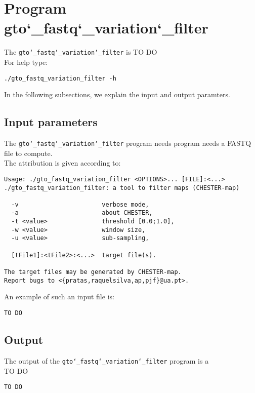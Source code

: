 \section{Program gto\char`_fastq\char`_variation\char`_filter}
The \texttt{gto\char`_fastq\char`_variation\char`_filter} is TO DO\\
For help type:
\begin{lstlisting}
./gto_fastq_variation_filter -h
\end{lstlisting}
In the following subsections, we explain the input and output paramters.

\subsection*{Input parameters}

The \texttt{gto\char`_fastq\char`_variation\char`_filter} program needs program needs a FASTQ file to compute.\\
The attribution is given according to:
\begin{lstlisting}
Usage: ./gto_fastq_variation_filter <OPTIONS>... [FILE]:<...>      
./gto_fastq_variation_filter: a tool to filter maps (CHESTER-map)  
                                                     
  -v                       verbose mode,             
  -a                       about CHESTER,            
  -t <value>               threshold [0.0;1.0],      
  -w <value>               window size,              
  -u <value>               sub-sampling,             
                                                     
  [tFile1]:<tFile2>:<...>  target file(s).           
                                                     
The target files may be generated by CHESTER-map.    
Report bugs to <{pratas,raquelsilva,ap,pjf}@ua.pt>. 
\end{lstlisting}
An example of such an input file is:
\begin{lstlisting}
TO DO
\end{lstlisting}

\subsection*{Output}
The output of the \texttt{gto\char`_fastq\char`_variation\char`_filter} program is a \\
TO DO
\begin{lstlisting}
TO DO
\end{lstlisting}
